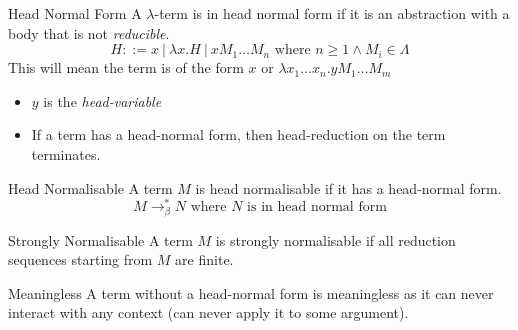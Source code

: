 \begin{definitionbox}{Head Normal Form}
    A $\lambda$-term is in head normal form if it is an abstraction with a body that is not \textit{reducible}.
    \[H ::= x \ | \ \lambda x. H \ | \ x M_1 \dots M_n \text{ where } n \geq 1 \land M_i \in \Lambda \]
    This will mean the term is of the form $x$ or $\lambda x_1 \dots x_n . y M_1 \dots M_m$
    \begin{itemize}
        \item $y$ is the \textit{head-variable}
        \item If a term has a head-normal form, then head-reduction on the term terminates.
    \end{itemize}
\end{definitionbox}

\begin{tcbraster}[raster columns=2, raster equal height]
    \begin{definitionbox}{Head Normalisable}
        A term $M$ is head normalisable if it has a head-normal form.
        \[M \to^*_\beta N \text{ where } N \text{ is in head normal form}\]
    \end{definitionbox}
    \begin{definitionbox}{Strongly Normalisable}
        A term $M$ is strongly normalisable if all reduction sequences starting from $M$ are finite.
    \end{definitionbox}
\end{tcbraster}
\begin{definitionbox}{Meaningless}
    A term without a head-normal form is meaningless as it can never interact with any context (can never apply it to some argument).
\end{definitionbox}

